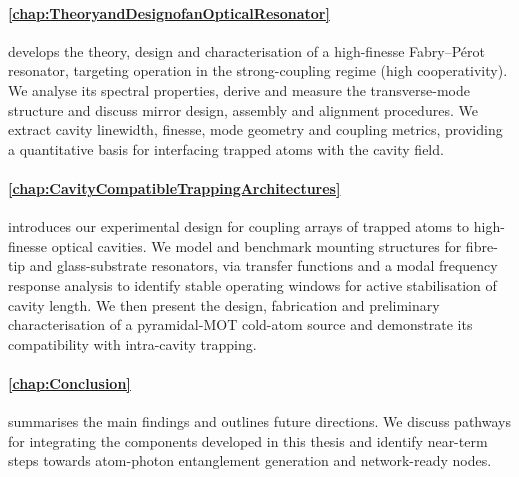 \documentclass[../Thesis-IJspeert.tex]{subfiles}
\begin{document}
\paragraph{\autoref{chap:TheoryandDesignofanOpticalResonator}} develops the theory, design and characterisation of a high-finesse Fabry--Pérot resonator, targeting operation in the strong-coupling regime (high cooperativity). We analyse its spectral properties, derive and measure the transverse-mode structure and discuss mirror design, assembly and alignment procedures. We extract cavity linewidth, finesse, mode geometry and coupling metrics, providing a quantitative basis for interfacing trapped atoms with the cavity field.

\paragraph{\autoref{chap:CavityCompatibleTrappingArchitectures}} introduces our experimental design for coupling arrays of trapped atoms to high-finesse optical cavities. We model and benchmark mounting structures for fibre-tip and glass-substrate resonators, via transfer functions and a modal frequency response analysis to identify stable operating windows for active stabilisation of cavity length. We then present the design, fabrication and preliminary characterisation of a pyramidal-MOT cold-atom source and demonstrate its compatibility with intra-cavity trapping.

\paragraph{\autoref{chap:Conclusion}} summarises the main findings and outlines future directions. We discuss pathways for integrating the components developed in this thesis and identify near-term steps towards atom-photon entanglement generation and network-ready nodes.
\end{document}
